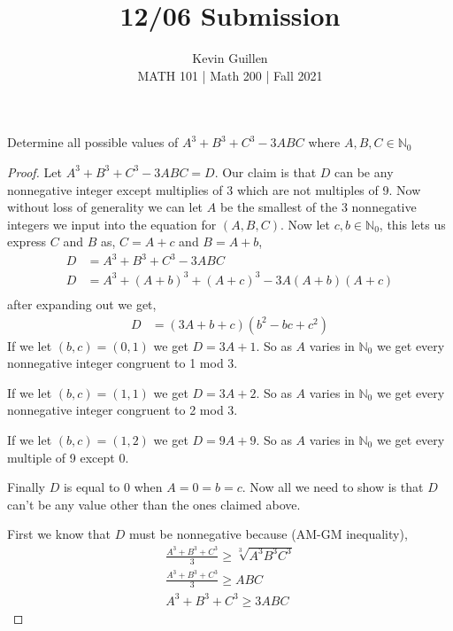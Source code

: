 \documentclass[11pt]{article}
\newenvironment{problem}[2][Problem\!]{\begin{trivlist}
\item[\hskip \labelsep {\bfseries #1}\hskip \labelsep {\bfseries #2}]}{\end{trivlist}}
\newcommand{\nn}{\mathbb N}   %
\renewcommand{\geq}{\geqslant}
\begin{document}
 
\title{12/06 Submission}
\author{Kevin Guillen\\[0.5em]
MATH 101  | Math 200 | Fall 2021}
\date{} 
\maketitle


\begin{tcolorbox}
    \begin{problem} {IC | 11/29 | PP 28}
        Determine all possible values of $A^{3} + B^{3} + C^{3} - 3ABC$ where $A,B,C \in \nn_0$
    \end{problem}
\end{tcolorbox}
\begin{proof}
    Let $A^{3} + B^{3} + C^{3} -3ABC = D$. Our claim is that $D$ can be any nonnegative integer except multiplies of 3 which are not multiples of 9. Now without loss of generality we can let $A$ be the smallest of the 3 nonnegative integers we input into the equation for $(A,B,C)$. Now let $c,b \in \nn_0$, this lets us express $C$ and $B$ as, $C = A + c$ and $B = A + b$,
    \begin{align*}
        D &= A^{3} + B^{3} + C^{3} -3ABC  \\
        D &= A^{3} + (A+b)^{3} + (A + c)^{3} - 3A(A+b)(A+c)  \\
    \end{align*}
    after expanding out we get,
    \begin{align*}
        D &= (3A + b + c)(b^{2} -bc + c^{2}) 
    \end{align*}
    If we let $(b,c) = (0,1)$ we get $D = 3A + 1$. So as $A$ varies in $\nn_0$ we get every nonnegative integer congruent to 1 mod 3. 

    If we let $(b,c) = (1,1)$ we get $D = 3A + 2$. So as $A$ varies in $\nn_0$ we get every nonnegative integer congruent to 2 mod 3.

    If we let $(b,c) = (1,2)$ we get $D = 9A + 9$. So as $A$ varies in $\nn_0$ we get every multiple of 9 except 0. 

    Finally $D$ is equal to 0 when $A = 0 = b = c$. Now all we need to show is that $D$ can't be any value other than the ones claimed above. 

    First we know that $D$ must be nonnegative because (AM-GM inequality),
    \begin{align*}
        \frac{A^{3} + B^{3} + C^{3}}{3} \geq \sqrt[3]{A^{3}B^{3}C^{3}} \\
        \frac{A^{3} + B^{3} + C^{3}}{3} \geq  ABC \\
        A^{3} + B^{3} + C^{3} \geq 3ABC
    \end{align*}


\end{proof}
\end{document}

